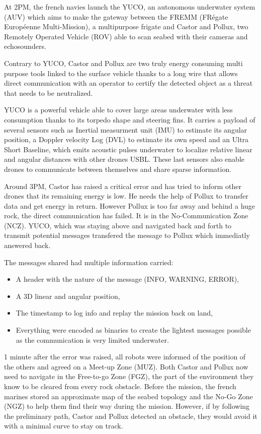 \documentclass[twocolumn]{article}
\begin{document}
At 2PM, the french navies launch the YUCO, an autonomous underwater system (AUV) which aims to make the gateway between the FREMM (FRégate Européenne Multi-Mission), a multipurpose frigate and Castor and Pollux, two Remotely Operated Vehicle (ROV) able to scan seabed with their cameras and echosounders.

Contrary to YUCO, Castor and Pollux are two truly energy consuming multi purpose tools linked to the surface vehicle thanks to a long wire that allows direct communication with an operator to certify the detected object as a threat that needs to be neutralized.

YUCO is a powerful vehicle able to cover large areas underwater with less consumption thanks to its torpedo shape and steering fins. It carries a payload of several sensors such as Inertial measurment unit (IMU) to estimate its angular position, a Doppler velocity Log (DVL) to estimate its own speed and an Ultra Short Baseline, which emits acoustic pulses underwater to localize relative linear and angular distances with other drones USBL. These last sensors also enable drones to communicate between themselves and share sparse information.

Around 3PM, Castor has raised a critical error and has tried to inform other drones that its remaining energy is low. He needs the help of Pollux to transfer data and get energy in return. However Pollux is too far away and behind a huge rock, the direct communication has failed. It is in the No-Communication Zone (NCZ). YUCO, which was staying above and navigated back and forth to transmit potential messages transfered the message to Pollux which immediatly answered back.

The messages shared had multiple information carried:
\begin{itemize}
    \item A header with the nature of the message (INFO, WARNING, ERROR),
    \item A 3D linear and angular position,
    \item The timestamp to log info and replay the mission back on land,
    \item Everything were encoded as binaries to create the lightest messages possible as the communication is very limited underwater.
\end{itemize}

1 minute after the error was raised, all robots were informed of the position of the others and agreed on a Meet-up Zone (MUZ). Both Castor and Pollux now need to navigate in the Free-to-go Zone (FGZ), the part of the environment they know to be cleared from every rock obstacle. Before the mission, the french marines stored an approximate map of the seabed topology and the No-Go Zone (NGZ) to help them find their way during the mission. However, if by following the preliminary path, Castor and Pollux detected an obstacle, they would avoid it with a minimal curve to stay on track.
\end{document}
